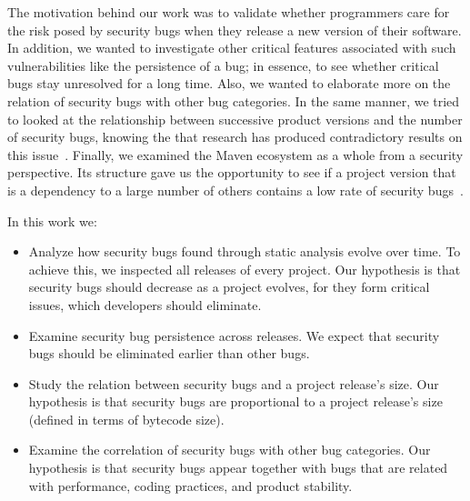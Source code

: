 \documentclass[conference]{llncs}
\begin{document}
The motivation behind our work was to validate whether programmers care for
the risk posed by security bugs when they release a new version of their software.
In addition, we wanted to investigate other critical features associated with such
vulnerabilities like the persistence of a bug;
in essence, to see whether critical bugs stay unresolved for a long time.
Also, we wanted to elaborate more on the relation of security
bugs with other bug categories.
In the same manner, we tried to looked at the relationship
between successive product versions and the number of security bugs,
knowing the that research has produced contradictory results on this
issue~\cite{BP84}\cite{SYTP85}\cite{NBZ06}\cite{GKMS00}.
Finally, we examined the Maven ecosystem as a whole from a security
perspective. Its structure gave us the opportunity to see if a project version that is a dependency to
a large number of others contains a low rate of security bugs~\cite{MW10}.

In this work we:
\begin{itemize}
	\item Analyze how security bugs found through static analysis
evolve over time. To achieve this, we inspected all releases of every project.
Our hypothesis is that security bugs should decrease as a project evolves,
for they form critical issues, which developers should eliminate.
	\item Examine security bug persistence across releases. 
We expect that security bugs should be eliminated earlier than other bugs.
	\item Study the relation between security bugs and a project
release's size. Our hypothesis is that security bugs are proportional to a project
release's size (defined in terms of bytecode size).
	\item Examine the correlation of security bugs with other bug categories.
Our hypothesis is that security bugs appear together with bugs that
are related with performance, coding practices, and product stability.
\end{itemize}
\end{document}
